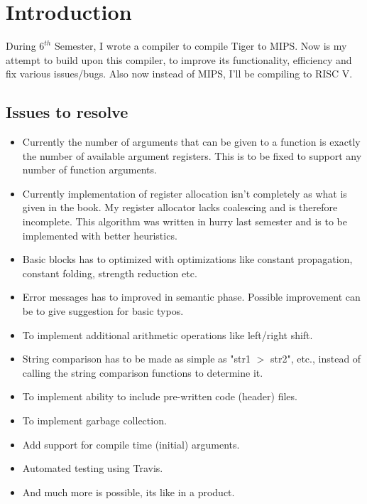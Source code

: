 \chapter{Introduction}
\hspace{3mm}

During $6^{th}$ Semester, I wrote a compiler to compile Tiger to MIPS. Now is my attempt to build upon this compiler, to improve its functionality, efficiency and fix various issues/bugs. Also now instead of MIPS, I'll be compiling to RISC V.

\section{Issues to resolve}


\begin{itemize}
  \item Currently the number of arguments that can be given to a function is exactly the number of available argument registers. This is to be fixed to support any number of function arguments. 
  \item Currently implementation of register allocation isn't completely as what is given in the book. My register allocator lacks coalescing and is therefore incomplete. This algorithm was written in hurry last semester and is to be implemented with better heuristics.
  \item Basic blocks has to optimized with optimizations like constant propagation, constant folding, strength reduction etc.
  \item Error messages has to improved in semantic phase. Possible improvement can be to give suggestion for basic typos. 
  \item To implement additional arithmetic operations like left/right shift.
  \item String comparison has to be made as simple as "str1 $>$ str2", etc.,  instead of calling the string comparison functions to determine it.
  \item To implement ability to include pre-written code (header) files.
  \item To implement garbage collection.
  \item Add support for compile time (initial) arguments.
  \item Automated testing using Travis.
  \item And much more is possible, its like in a product.
\end{itemize}


